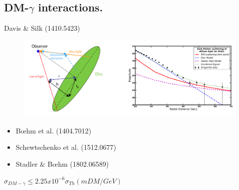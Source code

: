 \documentclass{beamer}
\begin{document}
\subsection{DM-$\gamma$ interactions.}
\frame{
\tableofcontents[ 
    currentsubsection, 
    sectionstyle=show/hide, 
    sectionstyle=show/shaded, 
    ] 
}

\begin{frame}
Davis \& Silk (1410.5423)
\begin{figure}[ht!]
 \centering
 \includegraphics[scale=0.18]{silk.png}
\end{figure}

 \begin{itemize}
  \item B{\oe}hm et al. (1404.7012)
  \item Schewtschenko et al. (1512.0677)
  \item Stadler \& B{\oe}hm (1802.06589)
 \end{itemize}
 
 $\sigma_{DM−\gamma} \leq 2.25x10^{-6}\sigma_{Th}(mDM/GeV) $
\end{frame}
\end{document}
